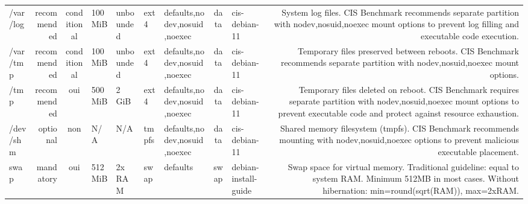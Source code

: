 \documentclass[10pt,a4paper]{article}
\begin{document}
{\begin{longtable}{M R S Z Z T O C I N}
/var/log & \textcolor{cHigh}{recommended} & conditional & 100 MiB & unbounded & ext4 & defaults,nodev,nosuid,noexec & data & cis-debian-11 & System log files. CIS Benchmark recommends separate partition with nodev,nosuid,noexec mount options to prevent log filling and executable code execution.\\
/var/tmp & \textcolor{cHigh}{recommended} & conditional & 100 MiB & unbounded & ext4 & defaults,nodev,nosuid,noexec & data & cis-debian-11 & Temporary files preserved between reboots. CIS Benchmark recommends separate partition with nodev,nosuid,noexec mount options.\\
/tmp & \textcolor{cHigh}{recommended} & \textcolor{cOk}{oui} & 500 MiB & 2 GiB & ext4 & defaults,nodev,nosuid,noexec & data & cis-debian-11 & Temporary files deleted on reboot. CIS Benchmark requires separate partition with nodev,nosuid,noexec mount options to prevent executable code and protect against resource exhaustion.\\
/dev/shm & \textcolor{cLow}{optional} & non & N/A & N/A & tmpfs & defaults,nodev,nosuid,noexec & data & cis-debian-11 & Shared memory filesystem (tmpfs). CIS Benchmark recommends mounting with nodev,nosuid,noexec options to prevent malicious executable placement.\\
swap & \textcolor{cBlock}{mandatory} & \textcolor{cOk}{oui} & 512 MiB & 2x RAM & swap & defaults & swap & debian-install-guide & Swap space for virtual memory. Traditional guideline: equal to system RAM. Minimum 512MB in most cases. Without hibernation: min=round(sqrt(RAM)), max=2xRAM.\\
\bottomrule\end{longtable}}
\end{document}
